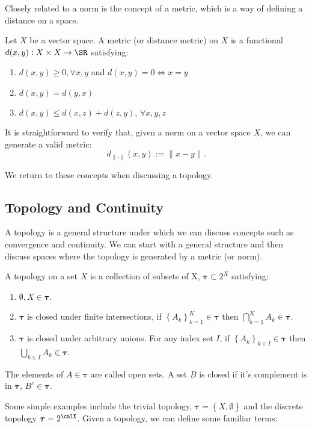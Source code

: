 Closely related to a norm is the concept of a metric, which is a way of defining a distance on a space. 
\begin{definition}[Metric]
	\label{def:metric}
	Let \(X\) be a vector space. A metric (or distance metric) on \(X\) is a functional  \(d(x,y): X \times X \to \SR\) satisfying:
	 \begin{enumerate}
		 \item \(d(x,y)\geq 0,\forall x,y\) and \(d(x,y) = 0 \iff x = y\)
		 \item \(d(x,y) = d(y,x)\)
		 \item \(d(x,y) \leq d(x,z) + d(z,y),\,\forall x,y,z\)
	\end{enumerate}
\end{definition}

It is straightforward to verify that, given a norm on a vector space \(X\), we can generate a valid metric:
 \[
	 d_{\|\cdot\|}(x,y) := \|x-y\|
.\]

We return to these concepts when discussing a topology. 

\subsection{Topology and Continuity}%
\label{subsec:topology}

A topology is a general structure under which we can discuss concepts such as convergence and continuity. We can start with a general structure and then discuss spaces where the topology is generated by a metric (or norm).

\begin{definition}[Topology]
	\label{def:topology}
	A topology on a set \(X\) is a collection of subsets of X, \(\boldsymbol{\tau} \subset 2^X\) satisfying:
	\begin{enumerate}
		\item \(\emptyset, X \in \boldsymbol{\tau}\).
		\item \(\boldsymbol{\tau}\) is closed under finite intersections, if \(\left\{A_k\right\}_{k=1}^K \in \boldsymbol{\tau}\) then \(\bigcap_{k=1}^K A_k \in \boldsymbol{\tau}\).
		\item \(\boldsymbol{\tau}\) is closed under arbitrary unions. For any index set \(I\), if \(\left\{A_k\right\}_{k\in I} \in \boldsymbol{\tau}\) then \(\bigcup_{k\in I} A_k \in \boldsymbol{\tau}\).
	\end{enumerate}
	The elements of \(A\in\boldsymbol\tau\) are called open sets. A set \(B\) is closed if it's complement is in \(\boldsymbol{\tau}\), \(B^c \in \boldsymbol{\tau}\).
\end{definition}
Some simple examples include the trivial topology, \(\boldsymbol{\tau} = \left\{X, \emptyset\right\}\) and the discrete topology  \(\boldsymbol{\tau} = 2^\calX\). Given a topology, we can define some familiar terms:

